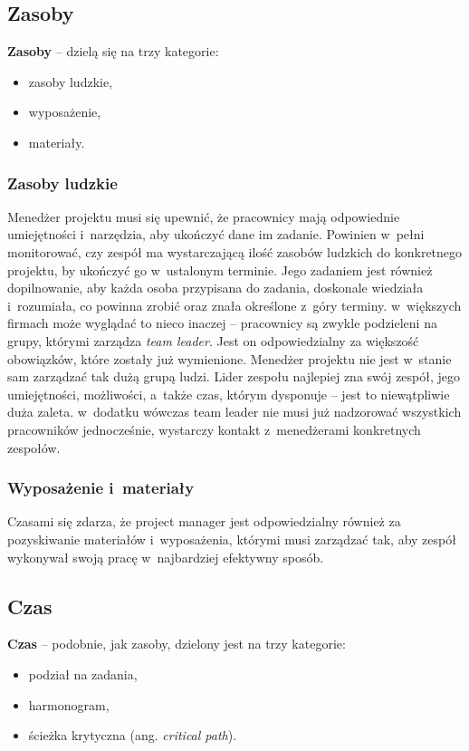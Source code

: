 \documentclass[oneside,polski,logo]{amuthesis}
\begin{document}
\subsection {Zasoby}
\textbf{Zasoby} – dzielą się na trzy kategorie:
\begin{itemize}
	\item zasoby ludzkie,
	\item wyposażenie,
	\item materiały.
\end{itemize}
\subsubsection {Zasoby ludzkie}

Menedżer projektu musi się upewnić, że pracownicy mają odpowiednie umiejętności i~narzędzia, aby ukończyć dane im zadanie. Powinien w~pełni monitorować, czy zespół ma wystarczającą ilość zasobów ludzkich do konkretnego projektu, by ukończyć go w~ustalonym terminie. Jego zadaniem jest również dopilnowanie, aby każda osoba przypisana do zadania, doskonale wiedziała i~rozumiała, co powinna zrobić oraz znała określone z~góry terminy. w~większych firmach może wyglądać to nieco inaczej – pracownicy są zwykle podzieleni na grupy, którymi zarządza \emph{team leader}. Jest on odpowiedzialny za większość obowiązków, które zostały już wymienione. Menedżer projektu nie jest w~stanie sam zarządzać tak dużą grupą ludzi. Lider zespołu najlepiej zna swój zespół, jego umiejętności, możliwości, a~także czas, którym dysponuje – jest to niewątpliwie duża zaleta. w~dodatku wówczas team leader nie musi już nadzorować wszystkich pracowników jednocześnie, wystarczy kontakt z~menedżerami konkretnych zespołów.

\subsubsection {Wyposażenie i~materiały}
Czasami się zdarza, że project manager jest odpowiedzialny również za pozyskiwanie materiałów i~wyposażenia, którymi musi zarządzać tak, aby zespół wykonywał swoją pracę w~najbardziej efektywny sposób.

\subsection {Czas}
\textbf{Czas} – podobnie, jak zasoby, dzielony jest na trzy kategorie:
\begin{itemize}
	\item podział na zadania,
	\item harmonogram,
	\item ścieżka krytyczna (ang. \emph{critical path}).
\end{itemize}
\end{document}

